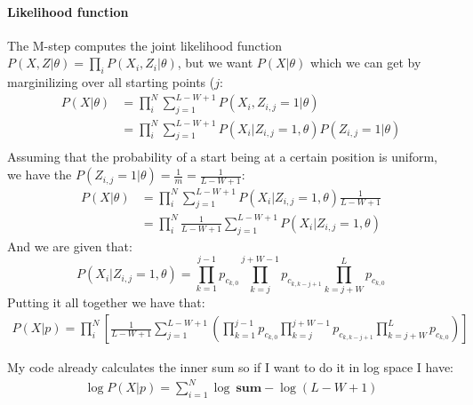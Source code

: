 \documentclass[10pt,a4paper]{article}
\begin{document}
\paragraph{Likelihood function}
The M-step computes the joint likelihood function $P(X,Z|\theta) = \displaystyle\prod\limits_i P(X_{i},Z_i | \theta)$, but we want $P(X|\theta)$ which we can get by marginilizing over all starting points ($j$:
\begin{align*}
    P(X|\theta) &= \displaystyle\prod\limits_i^N \displaystyle\sum_{j=1}^{L - W + 1} P(X_{i},Z_{i,j} = 1 | \theta)\\
                &=\displaystyle\prod\limits_i^N \displaystyle\sum_{j=1}^{L - W + 1}  P(X_{i}|Z_{i,j} = 1 , \theta)P(Z_{i,j}=1 | \theta)\\
\end{align*}
Assuming that the probability of a start being at a certain position is uniform, we have the $P(Z_{i,j}=1 | \theta) = \frac{1}{m} = \frac{1}{L - W + 1}$:
\begin{align*}
    P(X|\theta) &=\displaystyle\prod\limits_i^N \displaystyle\sum_{j=1}^{L - W + 1} P(X_{i}|Z_{i,j} = 1 , \theta)\frac{1}{L - W + 1}\\
                &= \displaystyle\prod\limits_i^N \frac{1}{L - W + 1}  \displaystyle\sum_{j=1}^{L - W + 1} P(X_{i}|Z_{i,j} = 1 , \theta)
\end{align*}
And we are given that:
\[
    P(X_i | Z_{i,j} = 1, \theta) = \displaystyle\prod\limits_{k=1}^{j-1}p_{c_{k,0}} \displaystyle\prod\limits_{k=j}^{j+W-1}p_{c_{k,k-j+1}} \displaystyle\prod\limits_{k=j+W}^{L}p_{c_{k,0}}
\] 
Putting it all together we have that:
\begin{align*}
    P(X | p) = \displaystyle\prod\limits_i^N \left[ \frac{1}{L - W + 1}  \displaystyle\sum_{j=1}^{L - W + 1} \left(\displaystyle\prod\limits_{k=1}^{j-1}p_{c_{k,0}} \displaystyle\prod\limits_{k=j}^{j+W-1}p_{c_{k,k-j+1}} \displaystyle\prod\limits_{k=j+W}^{L}p_{c_{k,0}}\right)\right]
\end{align*}

My code already calculates the inner sum so if I want to do it in log space I have:
\begin{align*}
    \log P(X|p) = \displaystyle\sum\limits_{i=1}^N \log \ \textbf{sum} -\log \left(L - W + 1\right) 
\end{align*}
\end{document}
